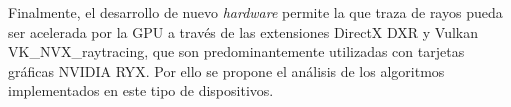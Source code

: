 Finalmente, el desarrollo de nuevo \textit{hardware} permite la que traza de rayos pueda ser acelerada por la GPU a través de las extensiones DirectX DXR y Vulkan VK\_NVX\_raytracing, que son predominantemente utilizadas con tarjetas gráficas NVIDIA RYX. Por ello se propone el análisis de los algoritmos implementados en este tipo de dispositivos.